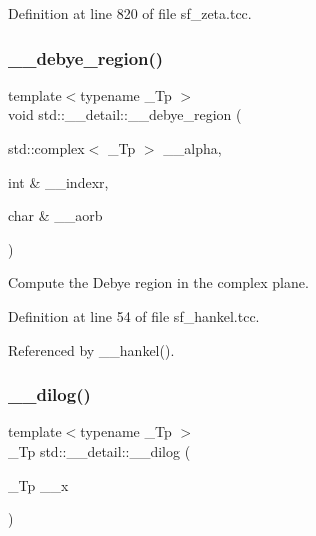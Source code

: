 Definition at line 820 of file sf\+\_\+zeta.\+tcc.

\mbox{\label{namespacestd_1_1____detail_a3212c0a136417e862f2ed8e9684e053c}} 
\subsubsection{\texorpdfstring{\+\_\+\+\_\+debye\+\_\+region()}{\_\_debye\_region()}}
{\footnotesize\ttfamily template$<$typename \+\_\+\+Tp $>$ \\
void std\+::\+\_\+\+\_\+detail\+::\+\_\+\+\_\+debye\+\_\+region (\begin{DoxyParamCaption}\item[{std\+::complex$<$ \+\_\+\+Tp $>$}]{\+\_\+\+\_\+alpha,  }\item[{int \&}]{\+\_\+\+\_\+indexr,  }\item[{char \&}]{\+\_\+\+\_\+aorb }\end{DoxyParamCaption})}

Compute the Debye region in the complex plane. 

Definition at line 54 of file sf\+\_\+hankel.\+tcc.



Referenced by \+\_\+\+\_\+hankel().

\mbox{\label{namespacestd_1_1____detail_a5083a0c9fce3299593ca22e7dbaeaf19}} 
\subsubsection{\texorpdfstring{\+\_\+\+\_\+dilog()}{\_\_dilog()}}
{\footnotesize\ttfamily template$<$typename \+\_\+\+Tp $>$ \\
\+\_\+\+Tp std\+::\+\_\+\+\_\+detail\+::\+\_\+\+\_\+dilog (\begin{DoxyParamCaption}\item[{\+\_\+\+Tp}]{\+\_\+\+\_\+x }\end{DoxyParamCaption})}



